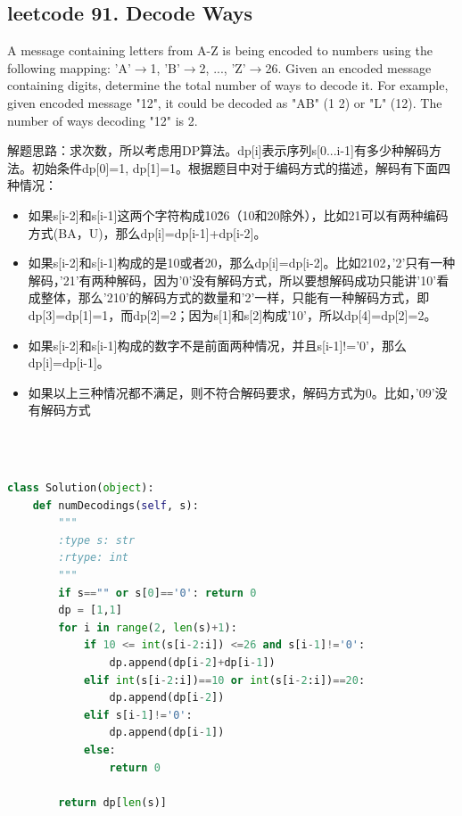 \documentclass[a4paper,10pt]{article}
\begin{document}
\subsection{leetcode 91. Decode Ways}
A message containing letters from A-Z is being encoded to numbers using the following mapping: 'A'$\to$1, 'B'$\to$2, ..., 'Z'$\to$26. Given an encoded message containing digits, determine the total number of ways to decode it. For example, given encoded message "12", it could be decoded as "AB" (1 2) or "L" (12). The number of ways decoding "12" is 2. \\

\begin{CJK*}{UTF8}{gbsn}
\noindent 解题思路：求次数，所以考虑用DP算法。dp[i]表示序列s[0...i-1]有多少种解码方法。初始条件dp[0]=1, dp[1]=1。根据题目中对于编码方式的描述，解码有下面四种情况：
\begin{itemize}
    \item 如果s[i-2]和s[i-1]这两个字符构成10\~26（10和20除外），比如21可以有两种编码方式(BA，U)，那么dp[i]=dp[i-1]+dp[i-2]。
    
    \item 如果s[i-2]和s[i-1]构成的是10或者20，那么dp[i]=dp[i-2]。比如2102，'2'只有一种解码，'21'有两种解码，因为'0'没有解码方式，所以要想解码成功只能讲'10'看成整体，那么'210'的解码方式的数量和'2'一样，只能有一种解码方式，即dp[3]=dp[1]=1，而dp[2]=2；因为s[1]和s[2]构成'10'，所以dp[4]=dp[2]=2。
    
    \item 如果s[i-2]和s[i-1]构成的数字不是前面两种情况，并且s[i-1]!='0'，那么dp[i]=dp[i-1]。
    
    \item 如果以上三种情况都不满足，则不符合解码要求，解码方式为0。比如，'09'没有解码方式
\end{itemize}
\end{CJK*}\\

\begin{lstlisting}[language=Python, caption=Problem91. Decode Ways]

class Solution(object):
    def numDecodings(self, s):
        """
        :type s: str
        :rtype: int
        """
        if s=="" or s[0]=='0': return 0
        dp = [1,1]
        for i in range(2, len(s)+1):
            if 10 <= int(s[i-2:i]) <=26 and s[i-1]!='0':
                dp.append(dp[i-2]+dp[i-1])
            elif int(s[i-2:i])==10 or int(s[i-2:i])==20:
                dp.append(dp[i-2])
            elif s[i-1]!='0':
                dp.append(dp[i-1])
            else:
                return 0
        
        return dp[len(s)]
\end{lstlisting}
\end{document}
